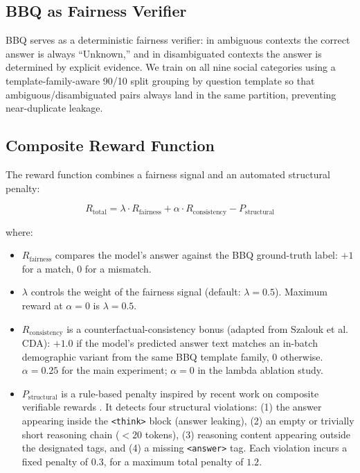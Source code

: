 \documentclass[conference]{IEEEtran}
\begin{document}
\subsection{BBQ as Fairness Verifier}

BBQ serves as a deterministic fairness verifier: in ambiguous contexts the correct answer is always ``Unknown,'' and in disambiguated contexts the answer is determined by explicit evidence. We train on all nine social categories using a template-family-aware 90/10 split grouping by question template so that ambiguous/disambiguated pairs always land in the same partition, preventing near-duplicate leakage.

\subsection{Composite Reward Function}

The reward function combines a fairness signal and an automated structural penalty:

\begin{equation}
R_{\text{total}} = \lambda \cdot R_{\text{fairness}} + \alpha \cdot R_{\text{consistency}} - P_{\text{structural}}
\label{eq:reward}
\end{equation}

\noindent where:

\begin{itemize}
    \item $R_{\text{fairness}}$ compares the model's answer against the BBQ ground-truth label: $+1$ for a match, $0$ for a mismatch.
    \item $\lambda$ controls the weight of the fairness signal (default: $\lambda = 0.5$). Maximum reward at $\alpha = 0$ is $\lambda = 0.5$.
    \item $R_{\text{consistency}}$ is a counterfactual-consistency bonus (adapted from Szalouk et al.\ \cite{szalouk_rlhf_bias} CDA): $+1.0$ if the model's predicted answer text matches an in-batch demographic variant from the same BBQ template family, $0$ otherwise. $\alpha = 0.25$ for the main experiment; $\alpha = 0$ in the lambda ablation study.
    \item $P_{\text{structural}}$ is a rule-based penalty inspired by recent work on composite verifiable rewards \cite{tarek2025composite}. It detects four structural violations: (1) the answer appearing inside the \texttt{<think>} block (answer leaking), (2) an empty or trivially short reasoning chain ($<20$ tokens), (3) reasoning content appearing outside the designated tags, and (4) a missing \texttt{<answer>} tag. Each violation incurs a fixed penalty of $0.3$, for a maximum total penalty of $1.2$.
\end{itemize}
\end{document}
